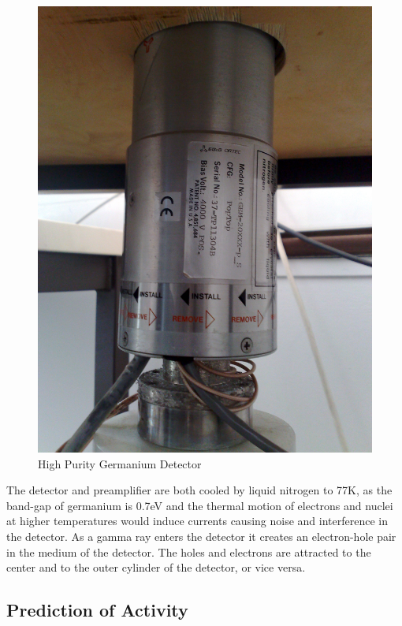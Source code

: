 \begin{figure}[htp]
  \begin{center}
    \includegraphics[scale=0.8]{chapters/activity_code/images/hpge.png}
    \caption{High Purity Germanium Detector}
    \label{fig:hpge}
  \end{center}
\end{figure}

The detector and preamplifier are both cooled by liquid nitrogen to 77K, as the band-gap of germanium is 0.7eV and the thermal motion of electrons and nuclei at higher temperatures would induce currents causing noise and interference in the detector.  As a gamma ray enters the detector it creates an electron-hole pair in the medium of the detector.  The holes and electrons are attracted to the center and to the outer cylinder of the detector, or vice versa.



\subsection{Prediction of Activity}

